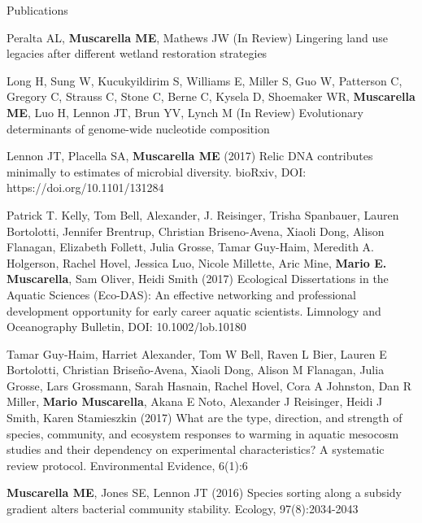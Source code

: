 \documentclass{resume} %
\begin{document}
\begin{rSection}{Publications}

Peralta AL, {\bf Muscarella ME}, Mathews JW (In Review) Lingering land use legacies after different wetland restoration strategies

Long H, Sung W, Kucukyildirim S, Williams E, Miller S, Guo W, Patterson C, Gregory C, Strauss C, Stone C, Berne C, Kysela D, Shoemaker WR, {\bf Muscarella ME}, Luo H, Lennon JT, Brun YV, Lynch M (In Review) Evolutionary determinants of genome-wide nucleotide composition

 Lennon JT, Placella SA, {\bf Muscarella ME} (2017) Relic DNA contributes minimally to estimates of microbial diversity. bioRxiv, DOI: https://doi.org/10.1101/131284

Patrick T. Kelly, Tom Bell, Alexander, J. Reisinger, Trisha Spanbauer, Lauren Bortolotti, Jennifer Brentrup, Christian Briseno-Avena, Xiaoli Dong, Alison Flanagan, Elizabeth Follett, Julia Grosse, Tamar Guy-Haim, Meredith A. Holgerson, Rachel Hovel, Jessica Luo, Nicole Millette, Aric Mine, {\bf Mario E. Muscarella}, Sam Oliver, Heidi Smith (2017) Ecological Dissertations in the Aquatic Sciences (Eco-DAS): An effective networking and professional development opportunity for early career aquatic scientists. Limnology and Oceanography Bulletin, DOI: 10.1002/lob.10180

Tamar Guy-Haim, Harriet Alexander, Tom W Bell, Raven L Bier, Lauren E
Bortolotti, Christian Briseño-Avena, Xiaoli Dong, Alison M Flanagan, Julia
Grosse, Lars Grossmann, Sarah Hasnain, Rachel Hovel, Cora A Johnston, Dan R
Miller, {\bf Mario Muscarella}, Akana E Noto, Alexander J Reisinger, Heidi J
Smith, Karen Stamieszkin (2017) What are the type, direction, and strength
of species, community, and ecosystem responses to warming in aquatic mesocosm
studies and their dependency on experimental characteristics? A systematic
review protocol. Environmental Evidence, 6(1):6

{\bf Muscarella ME}, Jones SE, Lennon JT (2016) Species sorting along a
subsidy gradient alters bacterial community stability. Ecology, 97(8):2034-2043


\end{rSection}
\end{document}
